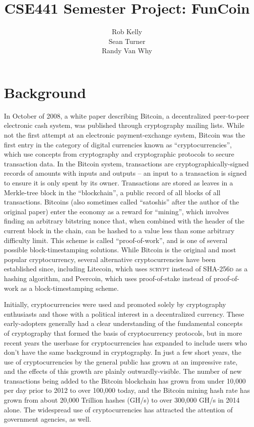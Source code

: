\documentclass[12pt]{article}
\begin{document}
\title{CSE441 Semester Project: FunCoin}
\author{Rob Kelly\\Sean Turner\\Randy Van Why}
\maketitle

\section{Background}
In October of 2008, a white paper\cite{nakamoto:bitcoin} describing Bitcoin, a decentralized peer-to-peer electronic cash system, was published through cryptography mailing lists. While not the first attempt at an electronic payment-exchange system, Bitcoin was the first entry in the category of digital currencies known as ``cryptocurrencies'', which use concepts from cryptography and cryptographic protocols to secure transaction data. In the Bitcoin system, transactions are cryptographically-signed records of amounts with inputs and outputs -- an input to a transaction is signed to ensure it is only spent by its owner. Transactions are stored as leaves in a Merkle-tree block in the ``blockchain'', a public record of all blocks of all transactions. Bitcoins (also sometimes called ``satoshis'' after the author of the original paper) enter the economy as a reward for ``mining'', which involves finding an arbitrary bitstring nonce that, when combined with the header of the current block in the chain, can be hashed to a value less than some arbitrary difficulty limit. This scheme is called ``proof-of-work'', and is one of several possible block-timestamping solutions. While Bitcoin is the original and most popular cryptocurrency, several alternative cryptocurrencies have been established since, including Litecoin\cite{mcmillan:litecoin}, which uses \textsc{scrypt} instead of \textsc{SHA-256d} as a hashing algorithm, and Peercoin\cite{king:peercoin}, which uses proof-of-stake instead of proof-of-work as a block-timestamping scheme.

Initially, cryptocurrencies were used and promoted solely by cryptography enthusiasts\cite{slashdot:bitcoin} and those with a political interest in a decentralized currency. These early-adopters generally had a clear understanding of the fundamental concepts of cryptography that formed the basis of cryptocurrency protocols, but in more recent years the userbase for cryptocurrencies has expanded to include users who don't have the same background in cryptography. In just a few short years, the use of cryptocurrencies by the general public has grown at an impressive rate, and the effects of this growth are plainly outwardly-visible. The number of new transactions being added to the Bitcoin blockchain has grown from under 10,000 per day prior to 2012 to over 100,000 today, and the Bitcoin mining hash rate has grown from about 20,000 Trillion hashes (GH/s) to over 300,000 GH/s  in 2014 alone. The widespread use of cryptocurrencies has attracted the attention of government agencies\cite{irs:bitcoin}, as well.
\end{document}
